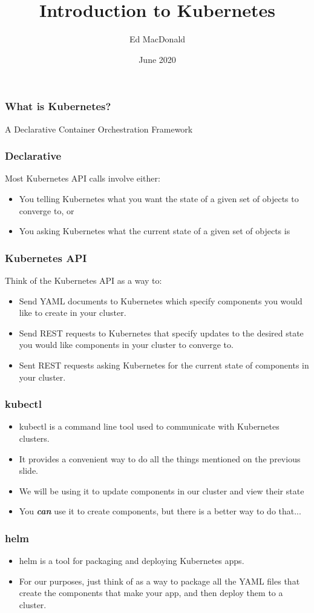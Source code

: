 \documentclass{beamer}
\title[Kubernetes]{Introduction to Kubernetes}
\author{Ed MacDonald}
\institute{Solution Street}
\date{June 2020}
\begin{document}
\frame{\titlepage}

\begin{frame}
\frametitle{What is Kubernetes?}
A Declarative Container Orchestration Framework
\end{frame}

\begin{frame}
\frametitle{Declarative}
Most Kubernetes API calls involve either:
\begin{itemize}
    \item You telling Kubernetes what you want the state of a given set of objects to converge to, or
    \item You asking Kubernetes what the current state of a given set of objects is
\end{itemize}
\end{frame}

\begin{frame}
\frametitle{Kubernetes API}
Think of the Kubernetes API as a way to:
\begin{itemize}
    \item Send YAML documents to Kubernetes which specify components you would like to create in your cluster.
    \item Send REST requests to Kubernetes that specify updates to the desired state you would like components in your cluster to converge to.
    \item Sent REST requests asking Kubernetes for the current state of components in your cluster.
\end{itemize}
\end{frame}

\begin{frame}
\frametitle{kubectl}
\begin{itemize}
\item kubectl is a command line tool used to communicate with Kubernetes clusters.
\item It provides a convenient way to do all the things mentioned on the previous slide.
\item We will be using it to update components in our cluster and view their state
\item You \textbf{\textit{can}} use it to create components, but there is a better way to do that...
\end{itemize}
\end{frame}

\begin{frame}
\frametitle{helm}
\begin{itemize}
    \item helm is a tool for packaging and deploying Kubernetes apps.
    \item For our purposes, just think of as a way to package all the YAML files that create the components that make your app, and then deploy them to a cluster.
\end{itemize}
\end{frame}
\end{document}
